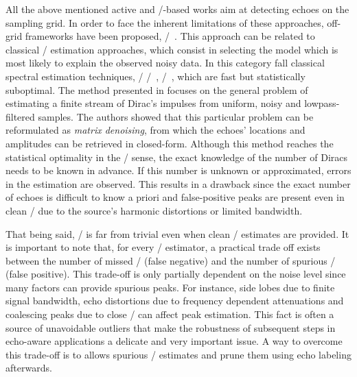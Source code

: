 \mynewline
All the above mentioned active and \RIR/-based works aim at detecting echoes on the sampling grid.
In order to face the inherent limitations of these approaches, off-grid frameworks have been proposed, \eg/~.
This approach can be related to classical \MLdef/ estimation approaches, which consist in selecting the model which is most likely to explain the observed noisy data.
In this category fall classical spectral estimation techniques, \eg/ \MUSIC/~, \ESPRIT/~, which are fast but statistically suboptimal.
The method presented in  focuses on the general problem of estimating a finite stream of Dirac's impulses from uniform, noisy and lowpass-filtered samples.
The authors showed that this particular problem can be reformulated as \textit{matrix denoising}, from which the echoes' locations and amplitudes can be retrieved in closed-form.
Although this method reaches the statistical optimality in the \ML/ sense, the exact knowledge of the number of Diracs needs to be known in advance.
If this number is unknown or approximated, errors in the estimation are observed.
This results in a drawback since the exact number of echoes is difficult to know a priori and false-positive peaks are present even in clean \RIRs/ due to the source's harmonic distortions or limited bandwidth.

\mynewline
That being said, \AER/ is far from trivial even when clean \RIR/ estimates are provided.
It is important to note that, for every \TOA/ estimator, a practical trade off exists between the number of missed \TOAs/ (false negative) and the number of spurious \TOAs/ (false positive).
This trade-off is only partially dependent on the noise level since many factors can provide spurious peaks.
For instance, side lobes due to finite signal bandwidth, echo distortions due to frequency dependent attenuations and coalescing peaks due to close \TOAs/ can affect peak estimation.
This fact is often a source of unavoidable outliers that make the robustness of subsequent steps in echo-aware applications a delicate and very important issue.
A way to overcome this trade-off is to allows spurious \TOAs/ estimates and prune them using echo labeling afterwards.

